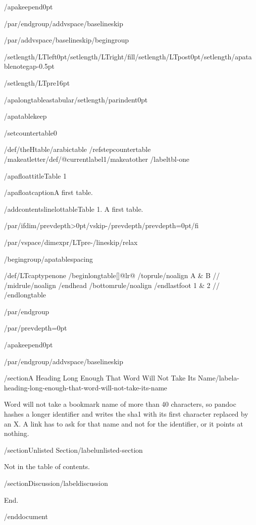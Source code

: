 /apakeepend{0pt}

/par/endgroup/addvspace{/baselineskip}

/par/addvspace{/baselineskip}/begingroup

/setlength{/LTleft}{0pt}/setlength{/LTright}{/fill}/setlength{/LTpost}{0pt}/setlength{/apatablenotegap}{-0.5pt}

/setlength{/LTpre}{16pt}

/apalongtableastabular/setlength{/parindent}{0pt}

/apatablekeep

/setcounter{table}{0}

/def/theHtable{/arabic{table}}%
/refstepcounter{table}%
/makeatletter/def/@currentlabel{1}/makeatother%
/label{tbl-one}

/apafloattitle{Table 1}

/apafloatcaption{A first table.}

/addcontentsline{lot}{table}{Table 1. A first table.}

/par/ifdim/prevdepth>0pt/vskip-/prevdepth/prevdepth=0pt/fi

/par/vspace{/dimexpr/LTpre-/lineskip/relax}

/begingroup/apatablespacing

{/def/LTcaptype{none} %
/begin{longtable}[]{@{}lr@{}}
/toprule/noalign{}
A & B //
/midrule/noalign{}
/endhead
/bottomrule/noalign{}
/endlastfoot
1 & 2 //
/end{longtable}
}

/par/endgroup

/par/prevdepth=0pt

/apakeepend{0pt}

/par/endgroup/addvspace{/baselineskip}

/section{A Heading Long Enough That Word Will Not Take Its
Name}/label{a-heading-long-enough-that-word-will-not-take-its-name}

Word will not take a bookmark name of more than 40 characters, so pandoc
hashes a longer identifier and writes the sha1 with its first character
replaced by an X. A link has to ask for that name and not for the
identifier, or it points at nothing.

/section{Unlisted Section}/label{unlisted-section}

Not in the table of contents.

/section{Discussion}/label{discussion}

End.




/end{document}
